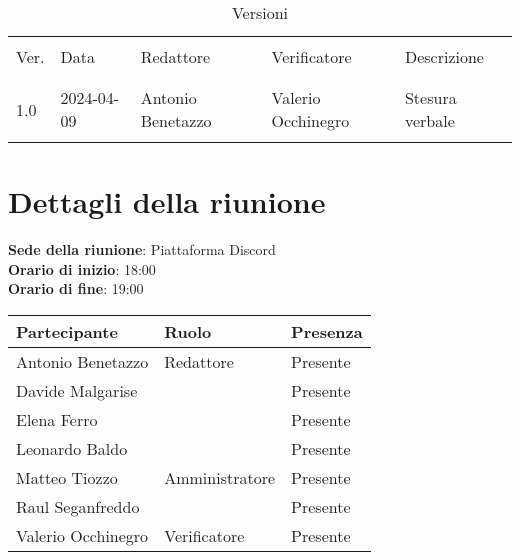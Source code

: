 \documentclass[italian,12pt]{article}
\begin{document}


\newpage



\begin{table}[!h]
	\caption{Versioni}
	\footnotesize
	\begin{center}
		\begin{tabular}{ l l l l l }
			\hline                                                                        \\[-2ex]
			Ver. & Data       & Redattore          & Verificatore       & Descrizione     \\
			\\[-2ex] \hline \\[-1.5ex]
			1.0  & 2024-04-09& Antonio Benetazzo  & Valerio Occhinegro & Stesura verbale \\
			\\[-1.5ex] \hline
		\end{tabular}
	\end{center}
\end{table}

\newpage

\tableofcontents

\newpage

\section{Dettagli della riunione}


\textbf{Sede della riunione}: Piattaforma Discord\\
\textbf{Orario di inizio}: 18:00\\
\textbf{Orario di fine}: 19:00\\


\begin{flushleft}
	\begin{table}[!h]
	\begin{tabular}{ |l|l|l| } 
		\hline
		\textbf{Partecipante} & \textbf{Ruolo}       & \textbf{Presenza} \\
		\hline 
		Antonio Benetazzo     & Redattore            & Presente          \\
		Davide Malgarise      &                      & Presente          \\
		Elena Ferro           &                      & Presente          \\
		Leonardo Baldo        &                      & Presente          \\
		Matteo Tiozzo         & Amministratore       & Presente          \\
		Raul Seganfreddo      &                      & Presente          \\
		Valerio Occhinegro    & Verificatore         & Presente          \\
		\hline
	\end{tabular}
	\end{table}
\end{flushleft}
\end{document}
